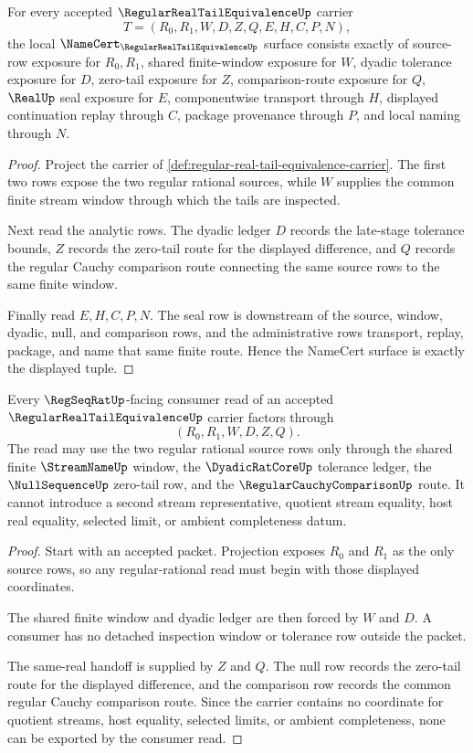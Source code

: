 \begin{theorem}
\label{thm:regular-real-tail-equivalence-namecert-obligations}
For every accepted $\RegularRealTailEquivalenceUp$ carrier
$$
T=(R_0,R_1,W,D,Z,Q,E,H,C,P,N),
$$
the local $\NameCert_{\RegularRealTailEquivalenceUp}$ surface consists exactly of source-row exposure for $R_0,R_1$, shared finite-window exposure for $W$, dyadic tolerance exposure for $D$, zero-tail exposure for $Z$, comparison-route exposure for $Q$, $\RealUp$ seal exposure for $E$, componentwise transport through $H$, displayed continuation replay through $C$, package provenance through $P$, and local naming through $N$.
\end{theorem}
\begin{proof}
Project the carrier of \autoref{def:regular-real-tail-equivalence-carrier}. The first two rows expose the two regular rational sources, while $W$ supplies the common finite stream window through which the tails are inspected.

Next read the analytic rows. The dyadic ledger $D$ records the late-stage tolerance bounds, $Z$ records the zero-tail route for the displayed difference, and $Q$ records the regular Cauchy comparison route connecting the same source rows to the same finite window.

Finally read $E,H,C,P,N$. The seal row is downstream of the source, window, dyadic, null, and comparison rows, and the administrative rows transport, replay, package, and name that same finite route. Hence the NameCert surface is exactly the displayed tuple.
\end{proof}

\begin{theorem}
\label{thm:regular-real-tail-equivalence-regseqrat-route}
Every $\RegSeqRatUp$-facing consumer read of an accepted $\RegularRealTailEquivalenceUp$ carrier factors through
$$
(R_0,R_1,W,D,Z,Q).
$$
The read may use the two regular rational source rows only through the shared finite $\StreamNameUp$ window, the $\DyadicRatCoreUp$ tolerance ledger, the $\NullSequenceUp$ zero-tail row, and the $\RegularCauchyComparisonUp$ route. It cannot introduce a second stream representative, quotient stream equality, host real equality, selected limit, or ambient completeness datum.
\end{theorem}
\begin{proof}
Start with an accepted packet. Projection exposes $R_0$ and $R_1$ as the only source rows, so any regular-rational read must begin with those displayed coordinates.

The shared finite window and dyadic ledger are then forced by $W$ and $D$. A consumer has no detached inspection window or tolerance row outside the packet.

The same-real handoff is supplied by $Z$ and $Q$. The null row records the zero-tail route for the displayed difference, and the comparison row records the common regular Cauchy comparison route. Since the carrier contains no coordinate for quotient streams, host equality, selected limits, or ambient completeness, none can be exported by the consumer read.
\end{proof}

